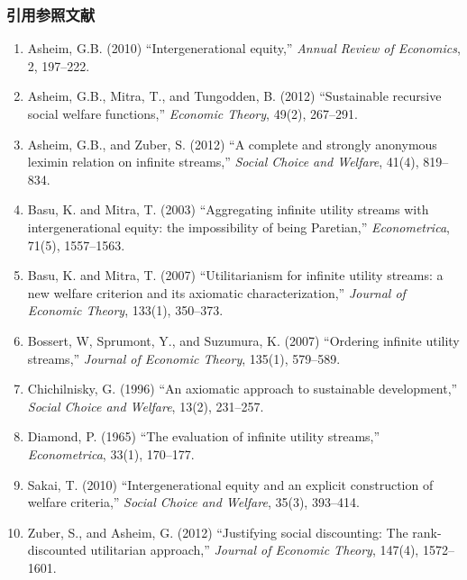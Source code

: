 \documentclass[11pt,a4paper]{article}
\begin{document}
\clearpage

\subsubsection*{引用参照文献}

\begin{enumerate}
  \item Asheim, G.B. (2010) ``Intergenerational equity,''
    \textit{Annual Review of Economics}, 2, 197--222.
  \item Asheim, G.B., Mitra, T., and Tungodden, B. (2012) ``Sustainable recursive social welfare functions,''
    \textit{Economic Theory}, 49(2), 267--291.
  \item Asheim, G.B., and Zuber, S. (2012) ``A complete and strongly anonymous leximin relation on infinite streams,''
    \textit{Social Choice and Welfare}, 41(4), 819--834.
  \item Basu, K. and Mitra, T. (2003) ``Aggregating infinite utility streams with intergenerational equity: the impossibility of being Paretian,''
    \textit{Econometrica}, 71(5), 1557--1563.
  \item Basu, K. and Mitra, T. (2007) ``Utilitarianism for infinite utility streams: a new welfare criterion and its axiomatic characterization,''
    \textit{Journal of Economic Theory}, 133(1), 350--373.
  \item Bossert, W, Sprumont, Y., and Suzumura, K. (2007) ``Ordering infinite utility streams,''
    \textit{Journal of Economic Theory}, 135(1), 579--589.
  \item Chichilnisky, G. (1996) ``An axiomatic approach to sustainable development,''
    \textit{Social Choice and Welfare}, 13(2), 231--257.
  \item Diamond, P. (1965) ``The evaluation of infinite utility streams,''
    \textit{Econometrica}, 33(1), 170--177.
  \item Sakai, T. (2010) ``Intergenerational equity and an explicit construction of welfare criteria,''
    \textit{Social Choice and Welfare}, 35(3), 393--414.
  \item Zuber, S., and Asheim, G. (2012) ``Justifying social discounting: The rank-discounted utilitarian approach,''
    \textit{Journal of Economic Theory}, 147(4), 1572--1601.
\end{enumerate}
\end{document}
